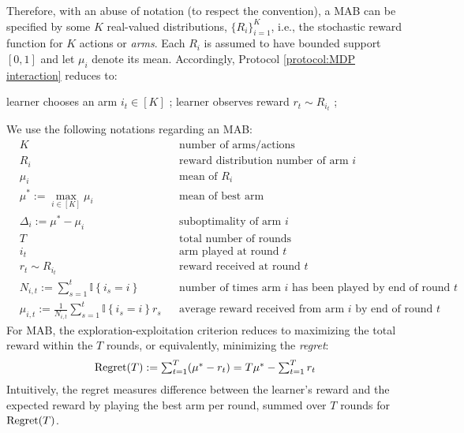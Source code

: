 Therefore, with an abuse of notation (to respect the convention), a MAB can be specified by some $K$ real-valued distributions, $\{R_i\}_{i=1}^K$, i.e., the stochastic reward function for $K$ actions or {\em arms}.
Each $R_i$ is assumed to have bounded support $[0,1]$ and let $\mu_i$ denote its mean.
Accordingly, Protocol \ref{protocol:MDP interaction} reduces to:
\begin{protocol}
\caption{MAB interaction} \label{protocol:MAB interaction}
\begin{algorithmic}[1]
    \State learner chooses an arm $i_t\in[K]$ ;
    \State learner observes reward $r_t\sim R_{i_t}$ ;
\EndFor
\end{algorithmic}
\end{protocol}


We use the following notations regarding an MAB:
\begin{align*}
    &K    && \text{number of arms/actions}\\
    &R_i  && \text{reward distribution number of arm $i$}\\
    &\mu_i && \text{mean of $R_i$}\\
    &\mu^* := \textstyle \max_{i\in[K]}\mu_i && \text{mean of best arm}\\
    &\Delta_i := \mu^* - \mu_i && \text{suboptimality of arm $i$}\\
    &T    && \text{total number of rounds}\\
    &i_t    && \text{arm played at round $t$}\\
    &r_t\sim R_{i_t}    && \text{reward received at round $t$}\\ 
    &N_{i,t}:=\textstyle\sum_{s=1}^t \mathbb{I}\left\{i_s=i\right\}    && \text{number of times arm $i$ has been played by end of round $t$}\\
    &\hat{\mu}_{i,t}:=\tfrac{1}{N_{i,t}} \textstyle\sum_{s=1}^t \mathbb{I}\left\{i_s=i\right\} r_s    && \text{average reward received from arm $i$ by end of round $t$}
\end{align*}
For MAB, the exploration-exploitation criterion reduces to maximizing the total reward within the $T$ rounds, or equivalently, minimizing the {\em regret}:
\begin{align}
\label{eq:regret}
\operatorname{Regret}(T) :=  \textstyle\sum_{t=1}^T (\mu^*-r_t) =T\mu^* - \textstyle\sum_{t=1}^Tr_t
\end{align}
Intuitively, the regret measures difference between the learner's reward and the expected reward by playing the best arm per round, summed over $T$ rounds for $\operatorname{Regret}(T)$.


